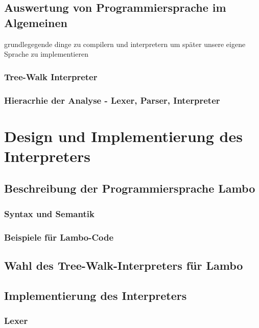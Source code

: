 \documentclass{article}
\begin{document}
\subsection{Auswertung von Programmiersprache im Algemeinen}

grundlegegende dinge zu compilern und interpretern um später unsere eigene Sprache zu implementieren

\subsubsection{Tree-Walk Interpreter}

\subsubsection{Hieracrhie der Analyse - Lexer, Parser, Interpreter}


\section{Design und Implementierung des Interpreters}

\subsection{Beschreibung der Programmiersprache Lambo}

\subsubsection{Syntax und Semantik}

\subsubsection{Beispiele für Lambo-Code}

\subsection{Wahl des Tree-Walk-Interpreters für Lambo}

\subsection{Implementierung des Interpreters}

\subsubsection{Lexer}
\end{document}

